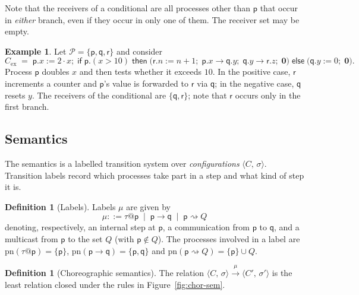 \documentclass[11pt]{article}
\makeatletter
\theoremstyle{plain}
\theoremstyle{definition}
\newtheorem{definition}[theorem]{Definition}
\newtheorem{example}[theorem]{Example}
\theoremstyle{remark}
\newcommand{\kw}[1]{\mathsf{#1}}
\newcommand{\kif}{\kw{if}\;}
\newcommand{\kthen}{\;\kw{then}\;}
\newcommand{\kelse}{\;\kw{else}\;}
\newcommand{\nil}{\mathbf{0}}
\newcommand{\seq}{;\;}
\newcommand{\pp}{\mathsf{p}}
\newcommand{\qq}{\mathsf{q}}
\newcommand{\rr}{\mathsf{r}}
\newcommand{\Procs}{\mathcal{P}}
\newcommand{\pn}{\mathrm{pn}}
\newcommand{\conf}[2]{\langle #1,\, #2\rangle}
\newcommand{\lto}[1]{\xrightarrow{\;#1\;}}
\newcommand{\tauat}[1]{\tau\mathord{@}#1}
\newcommand{\cast}[2]{#1 \rightsquigarrow #2}
\newcommand{\ifcond}[3]{\kif #1 \kthen #2 \kelse #3}
\makeatother
\begin{document}
Note that the receivers of a conditional are all processes other than $\pp$
that occur in \emph{either} branch, even if they occur in only one of them.
The receiver set may be empty.

\begin{example}\label{ex:chor}
  Let $\Procs = \{\pp,\qq,\rr\}$ and consider
  \[
    C_{\mathrm{ex}} \;=\;
    \pp.x := 2\cdot x \seq
    \ifcond{\pp.(x > 10)}
       {\big(\rr.n := n+1 \seq \pp.x \to \qq.y \seq \qq.y \to \rr.z \seq \nil\big)}
       {\big(\qq.y := 0 \seq \nil\big)}.
  \]
  Process $\pp$ doubles $x$ and then tests whether it exceeds $10$.  In the
  positive case, $\rr$ increments a counter and $\pp$'s value is forwarded to
  $\rr$ via $\qq$; in the negative case, $\qq$ resets $y$.  The receivers of the
  conditional are $\{\qq,\rr\}$; note that $\rr$ occurs only in the first
  branch.
\end{example}

\subsection{Semantics}

The semantics is a labelled transition system over \emph{configurations}
$\conf{C}{\sigma}$.  Transition labels record which processes take part in a
step and what kind of step it is.

\begin{definition}[Labels]\label{def:labels}
  Labels $\mu$ are given by
  \[
    \mu ::= \tauat{\pp} \;\mid\; \pp \to \qq \;\mid\; \cast{\pp}{Q}
  \]
  denoting, respectively, an internal step at $\pp$, a communication from
  $\pp$ to $\qq$, and a multicast from $\pp$ to the set $Q$ (with $\pp\notin Q$).
  The processes involved in a label are
  $\pn(\tauat{\pp}) = \{\pp\}$, $\pn(\pp\to\qq) = \{\pp,\qq\}$ and
  $\pn(\cast{\pp}{Q}) = \{\pp\}\cup Q$.
\end{definition}

\begin{definition}[Choreographic semantics]\label{def:chor-sem}
  The relation $\conf{C}{\sigma} \lto{\mu} \conf{C'}{\sigma'}$ is the least
  relation closed under the rules in Figure~\ref{fig:chor-sem}.
\end{definition}
\end{document}
